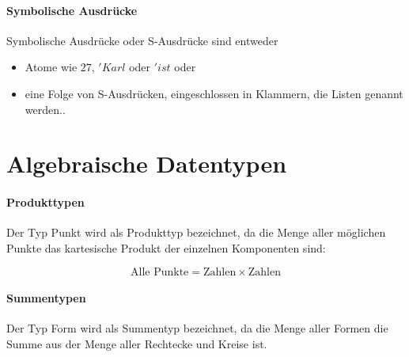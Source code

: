 \documentclass[../main.tex]{subfiles}
\begin{document}
            \paragraph{Symbolische Ausdrücke}
                Symbolische Ausdrücke oder S-Ausdrücke sind entweder 
                \begin{itemize}
                    \item Atome wie $27$, $'Karl$ oder $'ist$ oder
                    \item eine Folge von S-Ausdrücken, eingeschlossen in Klammern, die Listen genannt werden..
                \end{itemize}
                
    \section{Algebraische Datentypen}
        \paragraph{Produkttypen}
            Der Typ Punkt wird als Produkttyp bezeichnet, da die Menge aller möglichen Punkte das kartesische Produkt der einzelnen Komponenten sind:
            
            \begin{equation}
                \text{Alle Punkte} = \text{Zahlen} \times \text{Zahlen}
            \end{equation}
            
        \paragraph{Summentypen}
            Der Typ Form wird als Summentyp bezeichnet, da die Menge aller Formen die Summe aus der Menge aller Rechtecke und Kreise ist.
\end{document}
